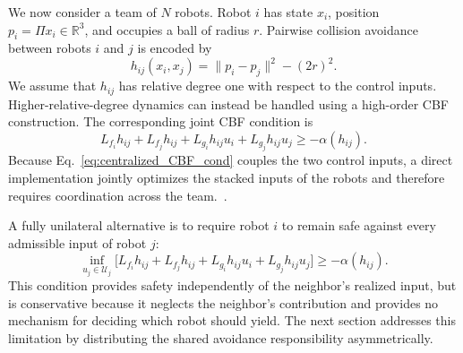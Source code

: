 We now consider a team of $N$ robots.
Robot $i$ has state $x_i$, position $p_i=\Pi x_i\in\mathbb{R}^3$, and occupies a ball of radius $r$.
Pairwise collision avoidance between robots $i$ and $j$ is encoded by
\begin{equation}
    h_{ij}(x_i, x_j) = \|p_i - p_j \|^2 - (2r)^2.
    \label{eq:pairwise_barrier}
\end{equation}
We assume that $h_{ij}$ has relative degree one with respect to the control inputs. 
Higher-relative-degree dynamics can instead be handled using a high-order CBF construction. 
The corresponding joint CBF condition is
\begin{equation}
    L_{f_i} h_{ij} + L_{f_j}h_{ij} +
    L_{g_i} h_{ij}u_i + L_{g_j} h_{ij}u_j
    \geq -\alpha (h_{ij}).
\label{eq:centralized_CBF_cond}
\end{equation}
Because Eq.~\eqref{eq:centralized_CBF_cond} couples the two control inputs, a direct implementation jointly optimizes the stacked inputs of the robots and therefore requires coordination across the team.~\cite{wang2017safety}.

A fully unilateral alternative is to require robot $i$ to remain safe against every admissible input of robot $j$:
\begin{equation}
    \inf_{u_j\in\mathcal{U}_j} 
    \Big[ L_{f_i} h_{ij} + L_{f_j} h_{ij} + 
    L_{g_i} h_{ij} u_i + L_{g_j}h_{ij}u_j \Big] \geq -\alpha(h_{ij}).
    \label{eq:worst_case_CBF_cond}
\end{equation}
This condition provides safety independently of the neighbor's realized input, but is conservative because it neglects the neighbor's contribution and provides no mechanism for deciding which robot should yield. 
The next section addresses this limitation by distributing the shared avoidance responsibility asymmetrically.